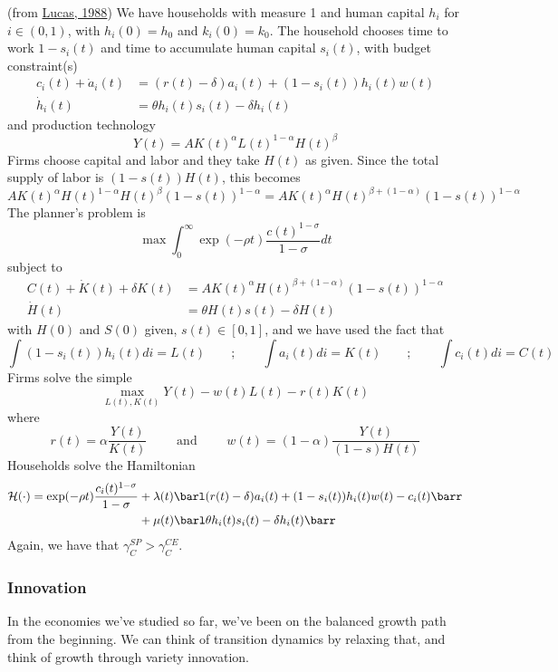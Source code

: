 \documentclass[10pt]{article}
\begin{document}
\begin{model}
	 (from \href{https://www.sciencedirect.com/science/article/pii/0304393288901687}{Lucas, 1988}) We have households with measure 1 and human capital $h_i$ for $i \in (0,1)$, with $h_i(0)=h_0$ and $k_i(0) = k_0$. The household chooses time to work $1-s_i(t)$ and time to accumulate human capital $s_i(t)$, with budget constraint(s)
	\begin{align*}
		c_i(t) + \dot{a}_i(t) &= (r(t)-\delta)a_i(t) + (1-s_i(t))h_i(t)w(t) \\
		\dot{h}_i(t) &= \theta h_i(t)s_i(t) - \delta h_i(t)
	\end{align*}
	and production technology \[Y(t) = AK(t)^\alpha L(t)^{1-\alpha}H(t)^\beta\]Firms choose capital and labor and they take $H(t)$ as given. Since the total supply of labor is $(1-s(t))H(t)$, this becomes \[AK(t)^\alpha H(t)^{1-\alpha}H(t)^\beta (1-s(t))^{1-\alpha} = AK(t)^\alpha H(t)^{\beta+ (1-\alpha)}(1-s(t))^{1-\alpha}\]The planner's problem is \[\max \int_0^\infty \exp(-\rho t) \frac{c(t)^{1-\sigma}}{1-\sigma} dt\]subject to\begin{align*} C(t) + \dot{K}(t) + \delta K(t) &= AK(t)^\alpha H(t)^{\beta+ (1-\alpha)}(1-s(t))^{1-\alpha} \\ \dot{H}(t) &= \theta H(t)s(t) - \delta H(t)\end{align*}with $H(0)$ and $S(0)$ given, $s(t) \in [0,1]$, and we have used the fact that \[\int(1-s_i(t))h_i(t) di = L(t) \qquad ; \qquad \int a_i(t)di = K(t) \qquad ; \qquad \int c_i(t) di = C(t)\]Firms solve the simple \[\max_{L(t),K(t)} Y(t) - w(t)L(t) - r(t)K(t)\]where \[r(t) = \alpha \frac{Y(t)}{K(t)} \qquad \text{ and } \qquad w(t) = (1-\alpha) \frac{Y(t)}{(1-s)H(t)}\]Households solve the Hamiltonian
	\begin{align*}
		\mathcal{H}(\cdot) = \exp(-\rho t) \frac{c_i(t)^{1-\sigma}}{1-\sigma} &+ \lambda(t)\barl (r(t)-\delta)a_i(t) + (1-s_i(t))h_i(t)w(t) - c_i(t)\barr \\ &+ \mu(t) \barl \theta h_i(t)s_i(t) - \delta h_i(t)\barr
	\end{align*}
	Again, we have that $\gamma_C^{SP} > \gamma_C^{CE}$.
\end{model}



\subsubsection{Innovation}

In the economies we've studied so far, we've been on the balanced growth path from the beginning. We can think of transition dynamics by relaxing that, and think of growth through variety innovation. 
\end{document}
